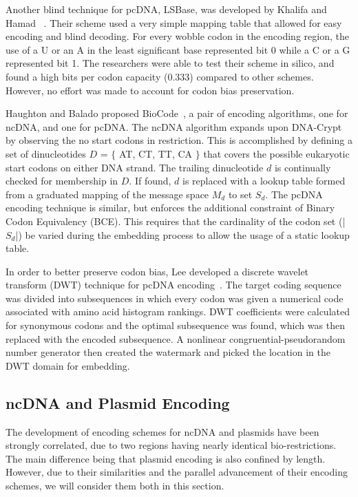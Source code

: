 \documentclass{bioinfo}
\begin{document}
Another blind technique for pcDNA, LSBase, was developed by Khalifa and Hamad ~\cite{KH2015BJOMACS}. Their scheme used a very simple mapping table that allowed for easy encoding and blind decoding. For every wobble codon in the encoding region, the use of a U or an A in the least significant base represented bit 0 while a C or a G represented bit 1. The researchers were able to test their scheme in silico, and found a high bits per codon capacity (0.333) compared to other schemes. However, no effort was made to account for codon bias preservation.

Haughton and Balado proposed BioCode~\cite{HBBMC2013}, a pair of encoding algorithms, one for ncDNA, and one for pcDNA. The ncDNA algorithm expands upon DNA-Crypt by observing the no start codons in restriction. This is accomplished by defining a set of dinucleotides $D$ = $\{$ AT, CT, TT, CA $\}$ that covers the possible eukaryotic start codons on either DNA strand. The trailing dinucleotide $d$ is continually checked for membership in $D$. If found, $d$ is replaced with a lookup table formed from a graduated mapping of the message space $M_d$ to set $S_d$. The pcDNA encoding technique is similar, but enforces the additional constraint of Binary Codon Equivalency (BCE). This requires that the cardinality of the codon set (|$S_d$|) be varied during the embedding process to allow the usage of a static lookup table.

In order to better preserve codon bias, Lee developed a discrete wavelet transform (DWT) technique for pcDNA encoding~\cite{L2014IS}. The target coding sequence was divided into subsequences in which every codon was given a numerical code associated with amino acid histogram rankings. DWT coefficients were calculated for synonymous codons and the optimal subsequence was found, which was then replaced with the encoded subsequence. A nonlinear congruential-pseudorandom number generator then created the watermark and picked the location in the DWT domain for embedding.

\subsection{ncDNA and Plasmid Encoding}

The development of encoding schemes for ncDNA and plasmids have been strongly correlated, due to two regions having nearly identical bio-restrictions. The main difference being that plasmid encoding is also confined by length. However, due to their similarities and the parallel advancement of their encoding schemes, we will consider them both in this section.
\end{document}
